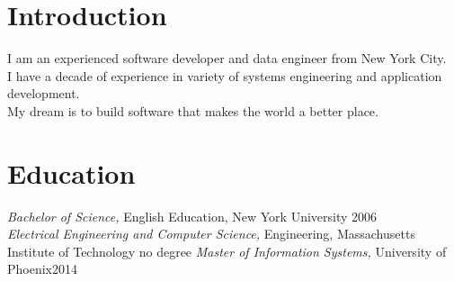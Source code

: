 \documentclass[line,overlapped]{res}
\begin{document}

\address{therenegadeoffunk@gmail.com \hspace{1.63in} Setagaya-ku, Tokyo, Japan}
\address{(070) 4069-4357}
\newsectionwidth{.2in}
\begin{resume}
\section{Introduction}
	I am an experienced software developer and data engineer from New York City. \\
    I have a decade of experience in variety of systems engineering and application development.\\ 
    My dream is to build software that makes the world a better place.

\section{Education}
{\sl Bachelor of Science,} English Education, New York University \hfill 2006\\
{\sl Electrical Engineering and Computer Science,} Engineering, Massachusetts Institute of Technology \hfill no degree
{\sl Master of Information Systems,} University of Phoenix\hfill 2014


\end{resume}
\end{document}
